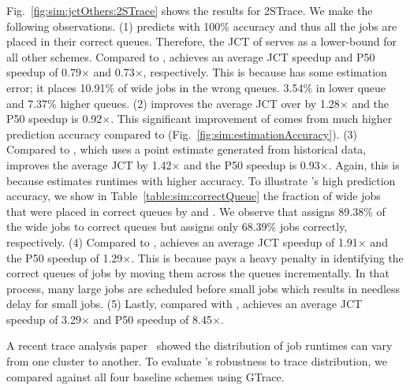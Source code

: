 Fig.~\ref{fig:sim:jctOthers:2STrace}
shows the results for 2STrace. We make the following observations.
(1) \oracle predicts with 100\% accuracy and thus all the jobs are placed in
their correct queues.  Therefore, the JCT of \oracle serves as a lower-bound
for all other schemes.
%
Compared to \oracle, \slearn achieves an average JCT speedup and P50 speedup of
0.79$\times$ and 0.73$\times$, respectively.
This is because \slearn has some estimation error; it places 10.91\% of wide
jobs in the wrong queues. 3.54\% in lower queue and 7.37\% higher queues.
(2) \slearn improves the average JCT over \primarybase by 1.28$\times$ and the
P50 speedup is 0.92$\times$.  This significant improvement of \slearn comes
from much higher prediction accuracy compared to \primarybasepredict
(Fig.~\ref{fig:sim:estimationAccuracy}).
(3) Compared to \pointestimator, \rm{which uses a point estimate generated from
historical data,} \slearn improves the average JCT by 1.42$\times$ and the P50
speedup is 0.93$\times$.
%
Again, this is because \slearn estimates runtimes with higher accuracy. 
%
To illustrate \slearn's high prediction accuracy,
we show in Table~\ref{table:sim:correctQueue} the fraction of wide jobs that were
placed in correct queues by \slearn and \primarybasepredict.
We observe that \slearn assigns 89.38\% of the wide jobs to correct queues but
\primarybasepredict assigns only 68.39\% jobs correctly,
respectively.
%
(4) Compared to \las, \slearn achieves an average JCT speedup of
1.91$\times$ and the P50 speedup of 1.29$\times$. This is because \las
pays a heavy penalty in identifying the correct queues of jobs
by moving them across the queues incrementally. In that process, many
large jobs are scheduled before small jobs which results in
needless delay for small jobs.
(5) Lastly, compared with \fifo,
\slearn achieves an average JCT speedup of 3.29$\times$ and P50
speedup of 8.45$\times$.

A recent trace analysis paper~\cite{workloadDiversity:atc18} showed
the distribution of job runtimes can vary from one cluster to another.
To evaluate \slearn's robustness to trace distribution, we compared
\slearn against all four baseline schemes using GTrace.  
\fi

